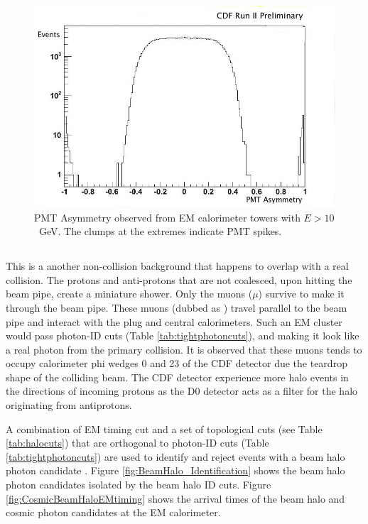 \documentclass[11pt]{article}
\begin{document}
\begin{figure}[htb!]
\begin{centering}
\includegraphics[scale=0.3]{PMT_EM_Asym_twrE_gt_10.jpg}
\caption{PMT Asymmetry observed from EM calorimeter towers with $E>10$~GeV. The clumps at the extremes indicate PMT spikes.}
\label{fig_PMTAsymmetry}
\end{centering}
\end{figure}


\subsection{\halojets}\label{halojets}
This is a another non-collision background that happens to overlap with a real collision. The protons and anti-protons that are not coalesced, upon hitting the beam pipe, create a miniature shower. Only the muons ($\mu$) survive to make it through the beam pipe. These muons (dubbed as ) travel parallel to the beam pipe and interact with the plug and central calorimeters. Such an EM cluster would pass photon-ID cuts (Table \ref{tab:tightphotoncuts}), and making it look like a real photon from the primary collision. It is observed that these muons tends to occupy calorimeter phi wedges 0 and 23 of the CDF detector due the teardrop shape of the colliding beam. The CDF detector experience more halo events in the directions of incoming protons as the D0 detector acts as a filter for the halo originating from antiprotons.

A combination of EM timing cut and a set of topological cuts (see  Table \ref{tab:halocuts}) that are orthogonal to photon-ID cuts (Table \ref{tab:tightphotoncuts}) are used to identify and reject events with a beam halo photon candidate \cite{cdfnote:8409, cdfnote:7960}. Figure \ref{fig:BeamHalo_Identification} shows the beam halo photon candidates isolated by the beam halo ID cuts. Figure \ref{fig:CosmicBeamHaloEMtiming} shows the arrival times of the beam halo and cosmic photon candidates at the EM calorimeter.
\end{document}
